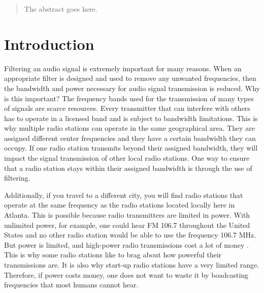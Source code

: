



\maketitle

\begin{abstract}
The abstract goes here.
\end{abstract}





%
\IEEEpeerreviewmaketitle



\section{Introduction}
Filtering an audio signal is extremely important for many reasons.  When an appropriate filter is designed and used to remove any unwanted frequencies, then the bandwidth and power necessary for audio signal transmission is reduced.  Why is this important?  The frequency bands used for the transmission of many types of signals are scarce resources.  Every transmitter that can interfere with others has to operate in a licensed band and is subject to bandwidth limitations.  This is why multiple radio stations can operate in the same geographical area.  They are assigned different center frequencies and they have a certain bandwidth they can occupy.  If one radio station transmits beyond their assigned bandwidth, they will impact the signal transmission of other local radio stations.  One way to ensure that a radio station stays within their assigned bandwidth is through the use of filtering.\cite{notes:class}    

Additionally, if you travel to a different city, you will find radio stations that operate at the same frequency as the radio stations located locally here in Atlanta.  This is possible because radio transmitters are limited in power.  With unlimited power, for example, one could hear FM 106.7 throughout the United States and no other radio station would be able to use the frequency 106.7 MHz.  But power is limited, and high-power radio transmissions cost a lot of money \cite{notes:class}.  This is why some radio stations like to brag about how powerful their transmissions are.  It is also why start-up radio stations have a very limited range.  Therefore, if power costs money, one does not want to waste it by boadcasting frequencies that most humans cannot hear. 

